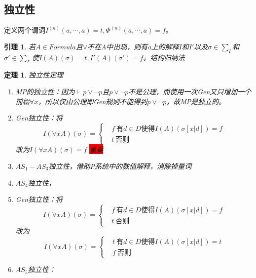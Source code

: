 \documentclass[a4paper]{ctexart}
\newtheorem{thm}{\hspace{2em}定理}[subsection]
\newtheorem{lem}{\hspace{2em}引理}
\newcommand{\shade}[1]{\colorbox{shadecolor}{#1}}
\newcommand{\redshade}[1]{\colorbox{red}{#1}}
\begin{document}
\subsection{独立性}
定义两个谓词$I^{(n)}(a,\cdots,a)=t,\Phi^{(n)}(a,\cdots,a)=f$。

\begin{lem}
  若$A\in Formula$且$\vee$不在A中出现，则有a上的解释$I$和$I'$以及$\sigma\in\sum_I$和$\sigma '\in\sum_{I'}$使$I(A)(\sigma)=t,I'(A)(\sigma')=f$。\shade{结构归纳法}
\end{lem}

\begin{thm}
  独立性定理
  \begin{enumerate}[itemindent=2em]
    \item MP的独立性：因为$\vdash p\vee\neg p$且$p\vee\neg p$不是公理，而使用一次Gen又只增加一个前缀$\forall{x}$，所以仅由公理即Gen规则不能得到$p\vee\neg p$，故MP是独立的。
    \item Gen独立性：将$$
      I(\forall{x}A)(\sigma)=\left\{\begin{aligned}
        &f \ \text{有}d\in D\text{使得}I(A)(\sigma[x|d])=f\\
        &t \ \text{否则}
      \end{aligned}\right.
    $$改为$I(\forall{x}A)(\sigma)=f$ \redshade{重要}
    \item $AS_1-AS_3$独立性，借助P系统中的数值解释，消除掉量词
    \item $AS_4$独立性，\item Gen独立性：将$$
      I(\forall{x}A)(\sigma)=\left\{\begin{aligned}
        &f \ \text{有}d\in D\text{使得}I(A)(\sigma[x|d])=f\\
        &t \ \text{否则}
      \end{aligned}\right.
    $$改为$$
      I(\forall{x}A)(\sigma)=\left\{\begin{aligned}
        &t \ \text{有}d\in D\text{使得}I(A)(\sigma[x|d])=t\\
        &f \ \text{否则}
      \end{aligned}\right.
    $$
    \item $AS_5$独立性：
    
  \end{enumerate}
\end{thm}
\end{document}
